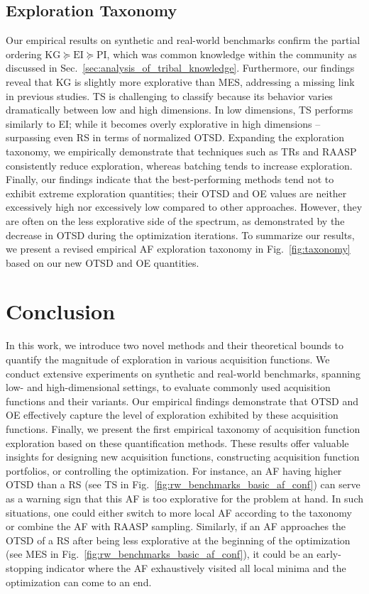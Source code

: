\documentclass[accepted]{uai2025}
\begin{document}
\subsection{Exploration Taxonomy}
Our empirical results on synthetic and real-world benchmarks confirm the partial ordering $\text{KG} \succeq \text{EI} \succeq \text{PI}$, which was common knowledge within the community as discussed in Sec.~\ref{sec:analysis_of_tribal_knowledge}. 
Furthermore, our findings reveal that \ac{KG} is slightly more explorative than \ac{MES}, addressing a missing link in previous studies. \ac{TS} is challenging to classify because its behavior varies dramatically between low and high dimensions. In low dimensions, \ac{TS} performs similarly to \ac{EI}; while it becomes overly explorative in high dimensions -- surpassing even \ac{RS} in terms of normalized \ac{OTSD}. 
Expanding the exploration taxonomy, we empirically demonstrate that techniques such as \acfp{TR} and \ac{RAASP} consistently reduce exploration, whereas batching tends to increase exploration. Finally, our findings indicate that the best-performing methods tend not to exhibit extreme exploration quantities; their \ac{OTSD} and \ac{OE} values are neither excessively high nor excessively low compared to other approaches. However, they are often on the less explorative side of the spectrum, as demonstrated by the decrease in OTSD during the optimization iterations.
To summarize our results, we present a revised empirical \ac{AF} exploration taxonomy in Fig.~\ref{fig:taxonomy} based on our new \ac{OTSD} and \ac{OE} quantities.

\section{Conclusion}

In this work, we introduce two novel methods and their theoretical bounds to quantify the magnitude of exploration in various acquisition functions. We conduct extensive experiments on synthetic and real-world benchmarks, spanning low- and high-dimensional settings, to evaluate commonly used acquisition functions and their variants. Our empirical findings demonstrate that \ac{OTSD} and \ac{OE} effectively capture the level of exploration exhibited by these acquisition functions. Finally, we present the first empirical taxonomy of acquisition function exploration based on these quantification methods. 
These results offer valuable insights for designing new acquisition functions, constructing acquisition function portfolios, or controlling the optimization.
For instance, an \ac{AF} having higher \ac{OTSD} than a \acl{RS} (see \ac{TS} in Fig.~\ref{fig:rw_benchmarks_basic_af_conf}) can serve as a warning sign that this \ac{AF} is too explorative for the problem at hand.
In such situations, one could either switch to more local \ac{AF} according to the taxonomy or combine the \ac{AF} with \ac{RAASP} sampling.
Similarly, if an \ac{AF} approaches the \ac{OTSD} of a \acl{RS} after being less explorative at the beginning of the optimization (see \ac{MES} in Fig.~\ref{fig:rw_benchmarks_basic_af_conf}), it could be an early-stopping indicator where the \ac{AF} exhaustively visited all local minima and the optimization can come to an end.
\end{document}
